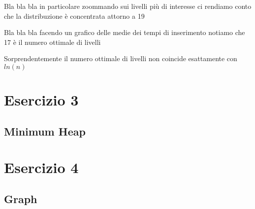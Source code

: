 \documentclass[12pt, letterpaper]{report}
\begin{document}
Bla bla bla in particolare zoommando sui livelli più di interesse ci rendiamo conto
che la distribuzione è concentrata attorno a 19
\begin{figure}[H]
\centering
    
\end{figure}

Bla bla bla facendo un grafico delle medie dei tempi di inserimento notiamo che 17
è il numero ottimale di livelli
\begin{figure}[H]
\centering
    
\end{figure}

Sorprendentemente il numero ottimale di livelli non coincide esattamente con $ln(n)$

\chapter*{Esercizio 3}
\section{Minimum Heap}

\chapter*{Esercizio 4}
\section{Graph}
\end{document}
